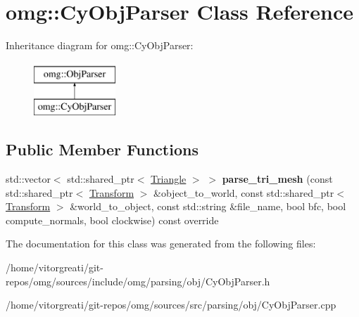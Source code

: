 \hypertarget{classomg_1_1_cy_obj_parser}{}\section{omg\+::Cy\+Obj\+Parser Class Reference}
\label{classomg_1_1_cy_obj_parser}
Inheritance diagram for omg\+::Cy\+Obj\+Parser\+:\begin{figure}[H]
\begin{center}
\leavevmode
\includegraphics[height=2.000000cm]{classomg_1_1_cy_obj_parser}
\end{center}
\end{figure}
\subsection*{Public Member Functions}
\begin{DoxyCompactItemize}
\item 
\mbox{\label{classomg_1_1_cy_obj_parser_a2e1d33eb052c611db7f98da6c1af55ee}} 
std\+::vector$<$ std\+::shared\+\_\+ptr$<$ \mbox{\hyperlink{classomg_1_1_triangle}{Triangle}} $>$ $>$ {\bfseries parse\+\_\+tri\+\_\+mesh} (const std\+::shared\+\_\+ptr$<$ \mbox{\hyperlink{classomg_1_1_transform}{Transform}} $>$ \&object\+\_\+to\+\_\+world, const std\+::shared\+\_\+ptr$<$ \mbox{\hyperlink{classomg_1_1_transform}{Transform}} $>$ \&world\+\_\+to\+\_\+object, const std\+::string \&file\+\_\+name, bool bfc, bool compute\+\_\+normals, bool clockwise) const override
\end{DoxyCompactItemize}


The documentation for this class was generated from the following files\+:\begin{DoxyCompactItemize}
\item 
/home/vitorgreati/git-\/repos/omg/sources/include/omg/parsing/obj/Cy\+Obj\+Parser.\+h\item 
/home/vitorgreati/git-\/repos/omg/sources/src/parsing/obj/Cy\+Obj\+Parser.\+cpp\end{DoxyCompactItemize}
